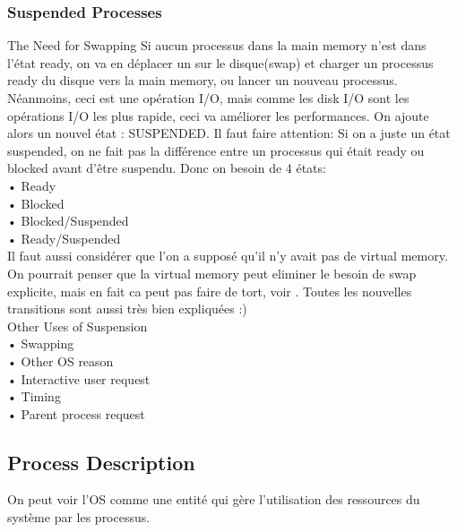 \subsubsection{Suspended Processes}
The Need for Swapping
Si aucun processus dans la main memory n'est dans l'état ready, on va en déplacer un sur le disque(swap) et charger un processus ready du disque vers la main memory, ou lancer un nouveau processus.
Néanmoins, ceci est une opération I/O, mais comme les disk I/O sont les opérations I/O les plus rapide, ceci va améliorer les performances.
On ajoute alors un nouvel état : SUSPENDED.
Il faut faire attention: Si on a juste un état suspended, on ne fait pas la différence entre un processus qui était ready ou blocked avant d'être suspendu.
Donc on besoin de 4 états: \\
• Ready \\
• Blocked \\
• Blocked/Suspended  \\
• Ready/Suspended \\
Il faut aussi considérer que l'on a supposé qu'il n'y avait pas de virtual memory.
On pourrait penser que la virtual memory peut eliminer le besoin de swap explicite, mais en fait ca peut pas faire de tort, voir \cite[p.~142]{stallings}.
Toutes les nouvelles transitions sont aussi très bien expliquées :) \\
Other Uses of Suspension \\
• Swapping \\
• Other OS reason \\
• Interactive user request \\
• Timing \\
• Parent process request \\
\subsection{Process Description}
On peut voir l'OS comme une entité qui gère l'utilisation des ressources du système par les processus.
